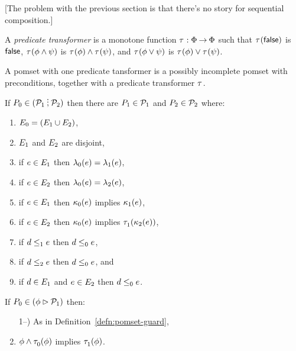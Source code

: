 [The problem with the previous section is that there's no story for sequential composition.]

\begin{definition}
  A \emph{predicate transformer} is a monotone function
  $\tau^{}:\Phi\mathbin\rightarrow\Phi$ such that
  $\tau^{}(\mathsf{false})$ is $\mathsf{false}$,
  $\tau^{}(\phi\land\psi)$ is $\tau^{}(\phi)\land\tau^{}(\psi)$, and
  $\tau^{}(\phi\lor\psi)$ is $\tau^{}(\phi)\lor\tau^{}(\psi)$.
\end{definition}

\begin{definition}
  A pomset with one predicate tansformer is a possibly incomplete
  pomset with preconditions, together with a predicate transformer $\tau^{}$.
\end{definition}

\begin{definition}
  If $\aPS_0 \in (\aPSS_1\sSEMI\aPSS_2)$ then
  there are $P_1\in\mathcal{P}_1$ and $P_2\in\mathcal{P}_2$ where:
  \begin{enumerate}
  \item $E_0 = (E_1\cup E_2)$,
  \item $E_1$ and  $E_2$ are disjoint,
  \item if $e\in E_1$ then $\lambda_0(e) = \lambda_1(e)$, 
  \item if $e\in E_2$ then $\lambda_0(e) = \lambda_2(e)$,
  \item if $e\in E_1$ then $\kappa_0(e)$ implies $\kappa_1(e)$, 
  \item if $e\in E_2$ then $\kappa_0(e)$ implies $\tau^{}_1(\kappa_2(e))$,
  \item if $d\le_1e$ then $d\le_0e$,
  \item if $d\le_2e$ then $d\le_0e$, and
  \item if $d\in E_1$ and $e\in E_2$ then $d\le_0e$.
  \end{enumerate}
\end{definition}

\begin{definition}
  If $P_0 \in (\phi\mathbin\rhd\mathcal{P}_1)$ then:
  \begin{enumerate}
    \setcounter{enumi}{\value{pomsetGuardCount}}
  \item[1--\thepomsetGuardCount)] As in Definition~\ref{defn:pomset-guard},
  \item $\phi\land\tau^{}_0(\phi)$ implies $\tau^{}_1(\phi)$.
  \end{enumerate}
\end{definition}

